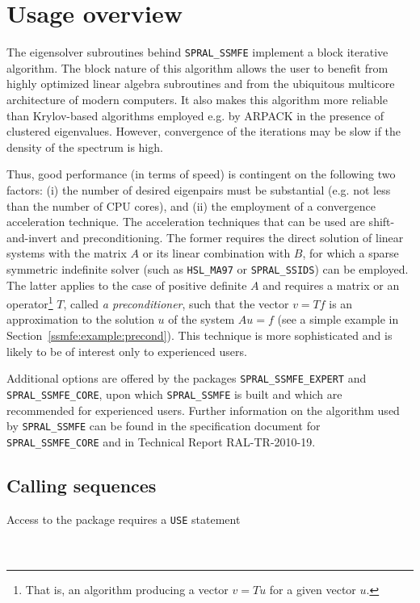 \section{Usage overview}

The eigensolver subroutines
behind \texttt{SPRAL\_SSMFE}
implement a block iterative algorithm.
The block nature of this algorithm allows the user
to benefit from highly optimized linear algebra subroutines
and from the ubiquitous multicore architecture
of modern computers.
It also makes this algorithm more reliable
than Krylov-based algorithms employed e.g. by ARPACK
in the presence of clustered eigenvalues.
However, convergence of the iterations may be slow
if the density of the spectrum is high.

Thus, good performance 
(in terms of speed)
is contingent on the following two factors:
(i) the number of desired
eigenpairs must be substantial
(e.g. not less than the number of CPU cores),
and
(ii) the employment of a convergence acceleration technique.
The acceleration techniques that can be used 
are shift-and-invert and preconditioning.
The former requires
the direct solution of linear systems
with the matrix $A$ or its linear combination with $B$,
for which a sparse symmetric indefinite solver
(such as {\tt HSL\_MA97} or {\tt SPRAL\_SSIDS}) can be employed.
The latter applies to the case of positive definite $A$ and
requires a matrix or an operator\footnote{
That is, an algorithm producing a vector $v = T u$ for a given
vector $u$.
}
$T$, called {\em a preconditioner},
such that the vector
$v = T f$ is an approximation to the solution $u$
of the system $A u = f$
(see a simple example in Section~\ref{ssmfe:example:precond}).
This technique is more sophisticated
and is likely to be of interest only to experienced users.

Additional
options are offered by
the packages \texttt{SPRAL\_SSMFE\_EXPERT} and \texttt{SPRAL\_SSMFE\_CORE},
upon which \texttt{SPRAL\_SSMFE} is built
and which are recommended for experienced users.
Further information on the algorithm used by
\texttt{SPRAL\_SSMFE} can be found in the
specification document for \texttt{SPRAL\_SSMFE\_CORE}
and in Technical Report RAL-TR-2010-19.

\subsection{Calling sequences}

Access to the package requires a {\tt USE} statement \\ \\
\indent\hspace{8mm}{\tt use SPRAL\_SSMFE} \\

